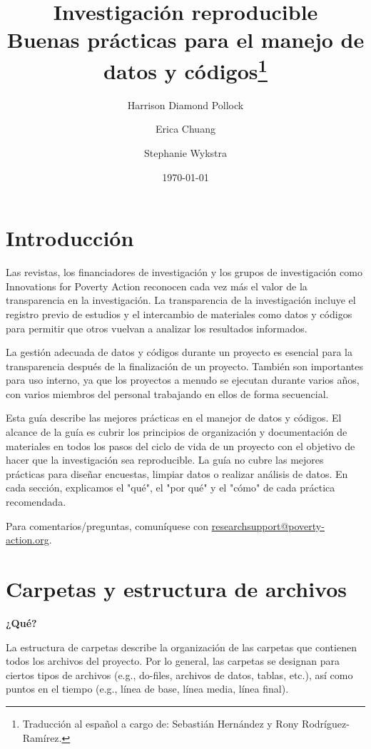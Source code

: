 \documentclass[11pt,en]{elegantpaper}
\title{Investigación reproducible \\ Buenas prácticas para el manejo de datos y códigos\footnote{Traducción al español a cargo de: Sebastián Hernández y Rony Rodríguez-Ramírez.}}
\author{Harrison Diamond Pollock \and Erica Chuang \and Stephanie Wykstra}
\date{\today}
\begin{document}
\maketitle
\tableofcontents
\newpage 
\section{Introducción}
Las revistas, los financiadores de investigación y los grupos de investigación como Innovations for Poverty Action reconocen cada vez más el valor de la transparencia en la investigación. La transparencia de la investigación incluye el registro previo de estudios y el intercambio de materiales como datos y códigos para permitir que otros vuelvan a analizar los resultados informados.

La gestión adecuada de datos y códigos durante un proyecto es esencial para la transparencia después de la finalización de un proyecto. También son importantes para uso interno, ya que los proyectos a menudo se ejecutan durante varios años, con varios miembros del personal trabajando en ellos de forma secuencial.

Esta guía describe las mejores prácticas en el manejor de datos y códigos. El alcance de la guía es cubrir los principios de organización y documentación de materiales en todos los pasos del ciclo de vida de un proyecto con el objetivo de hacer que la investigación sea reproducible. La guía no cubre las mejores prácticas para diseñar encuestas, limpiar datos o realizar análisis de datos. En cada sección, explicamos el "qué", el "por qué" y el "cómo" de cada práctica recomendada.

Para comentarios/preguntas, comuníquese con \href{mailto:researchsupport@poverty-action.org}{researchsupport@poverty-action.org}.
\section{Carpetas y estructura de archivos}
\textbf{¿Qué?}

La estructura de carpetas describe la organización de las carpetas que contienen todos los archivos del proyecto. Por lo general, las carpetas se designan para ciertos tipos de archivos (e.g., do-files, archivos de datos, tablas, etc.), así como puntos en el tiempo (e.g., línea de base, línea media, línea final).
\end{document}
